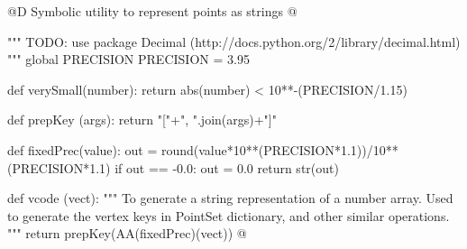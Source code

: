\documentclass[11pt,oneside]{article}	%
\begin{document}
@D Symbolic utility to represent points as strings
@{""" TODO: use package Decimal (http://docs.python.org/2/library/decimal.html) """
global PRECISION
PRECISION = 3.95

def verySmall(number): return abs(number) < 10**-(PRECISION/1.15)

def prepKey (args): return "["+", ".join(args)+"]"

def fixedPrec(value):
	out = round(value*10**(PRECISION*1.1))/10**(PRECISION*1.1)
	if out == -0.0: out = 0.0
	return str(out)
	
def vcode (vect): 
	"""
	To generate a string representation of a number array.
	Used to generate the vertex keys in PointSet dictionary, and other similar operations.
	"""
	return prepKey(AA(fixedPrec)(vect))
@}




\end{document}
